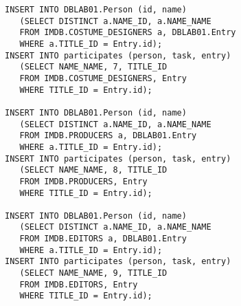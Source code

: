 \documentclass[11pt,a4paper,DIV=9]{scrartcl}
\begin{document}
\begin{lstlisting}
INSERT INTO DBLAB01.Person (id, name)
   (SELECT DISTINCT a.NAME_ID, a.NAME_NAME
   FROM IMDB.COSTUME_DESIGNERS a, DBLAB01.Entry
   WHERE a.TITLE_ID = Entry.id);
INSERT INTO participates (person, task, entry)
   (SELECT NAME_NAME, 7, TITLE_ID
   FROM IMDB.COSTUME_DESIGNERS, Entry
   WHERE TITLE_ID = Entry.id);

INSERT INTO DBLAB01.Person (id, name)
   (SELECT DISTINCT a.NAME_ID, a.NAME_NAME
   FROM IMDB.PRODUCERS a, DBLAB01.Entry
   WHERE a.TITLE_ID = Entry.id);
INSERT INTO participates (person, task, entry)
   (SELECT NAME_NAME, 8, TITLE_ID
   FROM IMDB.PRODUCERS, Entry
   WHERE TITLE_ID = Entry.id);

INSERT INTO DBLAB01.Person (id, name)
   (SELECT DISTINCT a.NAME_ID, a.NAME_NAME
   FROM IMDB.EDITORS a, DBLAB01.Entry
   WHERE a.TITLE_ID = Entry.id);
INSERT INTO participates (person, task, entry)
   (SELECT NAME_NAME, 9, TITLE_ID
   FROM IMDB.EDITORS, Entry
   WHERE TITLE_ID = Entry.id);
\end{lstlisting}
\end{document}
